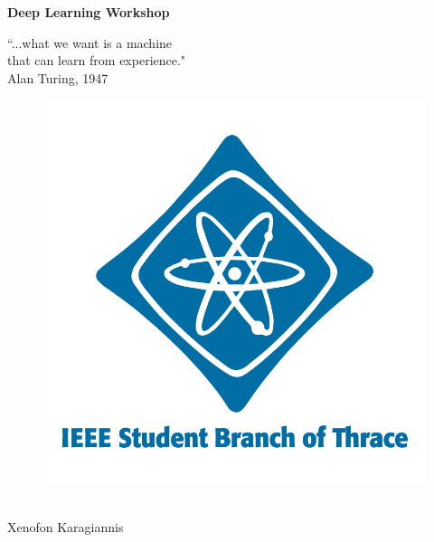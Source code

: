 \documentclass[10pt, compress]{beamer}
\begin{document}
\begin{frame}
\thispagestyle{empty}

\begin{flushleft}
\end{flushleft}
\Large{\textbf{Deep Learning Workshop}} \\

\begin{multicols}{2}
{\fontsize{10}{40} \selectfont ``...what we want is a machine} \\
\vspace*{-.3cm}
{\fontsize{10}{40} \selectfont that can learn from experience."} \\
\vspace*{-.3cm}
{\fontsize{8}{40} \selectfont  \qquad \qquad \qquad \qquad Alan Turing, 1947} \\

\columnbreak
\vspace*{-1.4cm}

\begin{figure}
  \includegraphics[width=.4\linewidth, right]{imgs/square-official-800}
\end{figure}
\end{multicols}
\vspace{-1.1cm}
\hrulefill \\
{\fontsize{10}{40} \selectfont Xenofon Karagiannis} \\

\end{frame}
\end{document}
